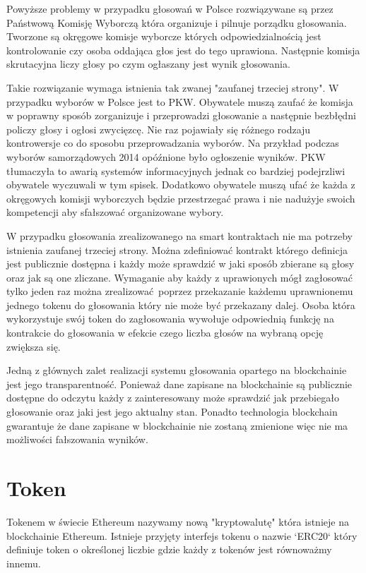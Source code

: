 \documentclass[]{llncs}
\begin{document}
  Powyższe problemy w przypadku głosowań w Polsce rozwiązywane są przez
  Państwową Komisję Wyborczą która organizuje i pilnuje porządku głosowania.
  Tworzone są okręgowe komisje wyborcze których odpowiedzialnością jest
  kontrolowanie czy osoba oddająca głos jest do tego uprawiona. Następnie
  komisja skrutacyjna liczy głosy po czym ogłaszany jest wynik głosowania.

  Takie rozwiązanie wymaga istnienia tak zwanej "zaufanej trzeciej strony". W
  przypadku wyborów w Polsce jest to PKW. Obywatele muszą zaufać że komisja w
  poprawny sposób zorganizuje i przeprowadzi głosowanie a następnie bezbłędni
  policzy głosy i ogłosi zwycięzcę.  Nie raz pojawiały się różnego rodzaju
  kontrowersje co do sposobu przeprowadzania wyborów. Na przykład podczas
  wyborów samorządowych 2014 opóźnione było ogłoszenie wyników.  PKW tłumaczyła
  to awarią systemów informacyjnych jednak co bardziej podejrzliwi obywatele
  wyczuwali w tym spisek. Dodatkowo obywatele muszą ufać że każda z okręgowych
  komisji wyborczych będzie przestrzegać prawa i nie nadużyje swoich kompetencji
  aby sfałszować organizowane wybory.

  W przypadku głosowania zrealizowanego na smart kontraktach nie ma potrzeby
  istnienia zaufanej trzeciej strony. Można zdefiniować kontrakt którego
  definicja jest publicznie dostępna i każdy może sprawdzić w jaki sposób
  zbierane są głosy oraz jak są one zliczane. Wymaganie aby każdy z uprawionych
  mógł zagłosować tylko jeden raz można zrealizować poprzez przekazanie każdemu
  uprawnionemu jednego tokenu do głosowania który nie może być przekazany dalej.
  Osoba która wykorzystuje swój token do zagłosowania wywołuje odpowiednią
  funkcję na kontrakcie do głosowania w efekcie czego liczba głosów na wybraną
  opcję zwiększa się.

  Jedną z głównych zalet realizacji systemu głosowania opartego na blockchainie
  jest jego transparentność. Ponieważ dane zapisane na blockchainie są
  publicznie dostępne do odczytu każdy z zainteresowany może sprawdzić jak
  przebiegało głosowanie oraz jaki jest jego aktualny stan. Ponadto technologia
  blockchain gwarantuje że dane zapisane w blockchainie nie zostaną zmienione
  więc nie ma możliwości fałszowania wyników.

\section{Token}

  Tokenem w świecie Ethereum nazywamy nową "kryptowalutę" która istnieje na
  blockchainie Ethereum. Istnieje przyjęty interfejs tokenu o nazwie `ERC20`
  który definiuje token o określonej liczbie gdzie każdy z tokenów jest
  równoważmy innemu.
\end{document}
